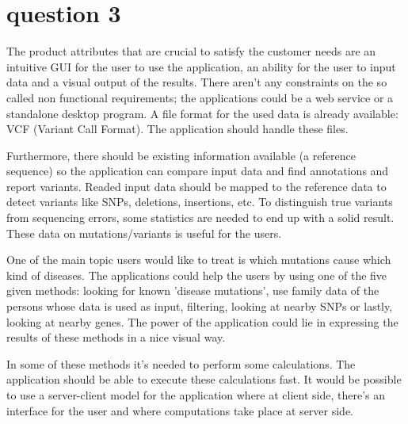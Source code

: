 \section{question 3}
The product attributes that are crucial to satisfy the customer needs are an intuitive GUI for the user to use the application, an ability for the user to input data and a visual output of the results. There aren't any constraints on the so called non functional requirements; the applications could be a web service or a standalone desktop program. A file format for the used data is already available: VCF (Variant Call Format). The application should handle these files.

Furthermore, there should be existing information available (a reference sequence) so the application can compare input data and find annotations and report variants. Readed input data should be mapped to the reference data to detect variants like SNPs, deletions, insertions, etc. To distinguish true variants from sequencing errors, some statistics are needed to end up with a solid result. These data on mutations/variants is useful for the users.

One of the main topic users would like to treat is which mutations cause which kind of diseases. The applications could help the users by using one of the five given methods: looking for known 'disease mutations', use family data of the persons whose data is used as input, filtering, looking at nearby SNPs or lastly, looking at nearby genes. The power of the application could lie in expressing the results of these methods in a nice visual way.

In some of these methods it's needed to perform some calculations. The application should be able to execute these calculations fast. It would be possible to use a server-client model for the application where at client side, there's an interface for the user and where computations take place at server side.